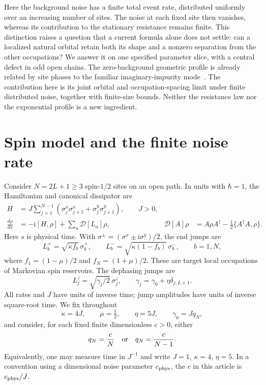 \documentclass[11pt,a4paper]{article}
\newcommand{\D}{\mathcal{D}}
\newcommand{\ii}{\mathrm{i}}
\begin{document}
Here the background noise has a finite total event rate, distributed
uniformly over an increasing number of sites. The noise at each fixed
site then vanishes, whereas its contribution to the stationary
resistance remains finite. This distinction raises a question that a
current formula alone does not settle: can a localized natural orbital
retain both its shape and a nonzero separation from the other
occupations? We answer it on one specified parameter slice, with a
central defect in odd open chains. The zero-background geometric profile
is already related by site phases to the familiar imaginary-impurity
mode~\cite{Kokkinakis2026}. The contribution here is its joint orbital and
occupation-spacing limit under finite distributed noise, together with
finite-size bounds. Neither the resistance law nor the exponential
profile is a new ingredient.

\section{Spin model and the finite noise rate}
Consider $N=2L+1\ge3$ spin-$1/2$ sites on an open path. In units with
$\hbar=1$, the Hamiltonian and canonical dissipator are
\begin{align}
 H&=J\sum_{j=1}^{N-1}
 (\sigma_j^x\sigma_{j+1}^x+\sigma_j^y\sigma_{j+1}^y),\qquad J>0,
 \label{eq:H}\\
 \frac{d\rho}{ds}&=-\ii[H,\rho]+\sum_a\D[L_a]\rho,
 &\D[A]\rho&=A\rho A^\dagger-\tfrac12\{A^\dagger A,\rho\}.
 \label{eq:GKSL}
\end{align}
Here $s$ is physical time. With
$\sigma^\pm=(\sigma^x\pm\ii\sigma^y)/2$, the end jumps are
\begin{equation}
 L_b^+=\sqrt{\kappa f_b}\,\sigma_b^+,
 \qquad L_b^-=\sqrt{\kappa(1-f_b)}\,\sigma_b^-,
 \qquad b=1,N,
 \label{eq:baths}
\end{equation}
where $f_1=(1-\mu)/2$ and $f_N=(1+\mu)/2$. These are target local
occupations of Markovian spin reservoirs. The dephasing jumps are
\begin{equation}
 L_j^z=\sqrt{\gamma_j/2}\,\sigma_j^z,
 \qquad \gamma_j=\gamma_0+\eta\delta_{j,L+1}.
 \label{eq:dephasing}
\end{equation}
All rates and $J$ have units of inverse time; jump amplitudes have units
of inverse square-root time. We fix throughout
\begin{equation}
 \kappa=4J,\qquad \mu=\tfrac12,\qquad \eta=5J,
 \qquad \gamma_0=Jq_N,
 \label{eq:parameters}
\end{equation}
and consider, for each fixed finite dimensionless $c>0$, either
\begin{equation}
 q_N=\frac{c}{N}\quad\hbox{or}\quad q_N=\frac{c}{N-1}.
 \label{eq:scalings}
\end{equation}
Equivalently, one may measure time in $J^{-1}$ and write $J=1$,
$\kappa=4$, $\eta=5$. In a convention using a dimensional noise
parameter $c_{\rm phys}$, the $c$ in this article is $c_{\rm phys}/J$.
\end{document}
